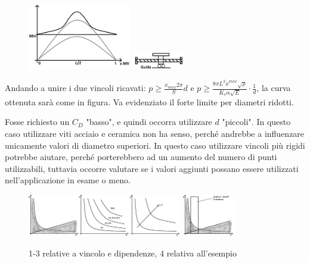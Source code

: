\begin{figure}[h]
    \centering
    \includegraphics[width=0.4\textwidth]{Immagini/vel_critica_vite_2sol.png}
    \includegraphics[width=0.2\textwidth]{Immagini/vite_guida_MV.png}
\end{figure}

Andando a unire i due vincoli ricavati: \(p \geqslant \frac{\dot{x_{max}} 2\pi }{S} d\) e \( p \geqslant \frac{8\pi L^2 \dot{x}^{max} \sqrt{\rho}}{K_v \alpha \sqrt{E}} \cdot \frac{1}{d} \), la curva ottenuta sarà come in figura. Va evidenziato il forte limite per diametri ridotti.

Fosse richiesto un \( C_D \) "basso", e quindi occorra utilizzare \(d\) "piccoli". In questo caso utilizzare viti acciaio e ceramica non ha senso, perché andrebbe a influenzare unicamente valori di diametro superiori. In questo caso utilizzare vincoli più rigidi potrebbe aiutare, perché porterebbero ad un aumento del numero di punti utilizzabili, tuttavia occorre valutare se i valori aggiunti possano essere utilizzati nell'applicazione in esame o meno.

\begin{figure}[h]
    \centering
    \includegraphics[width=0.6\textwidth]{Immagini/viti_ricir_vincoli_p_d.png}
    \includegraphics[width=0.2\textwidth]{Immagini/viti_ricir_esempio_vincoli.png}
    \caption{1-3 relative a vincolo e dipendenze, 4 relativa all'esempio}
\end{figure}

